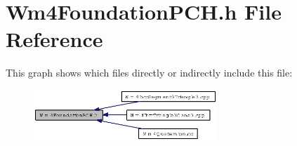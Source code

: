 \section{Wm4Foundation\-PCH.h File Reference}
\label{Wm4FoundationPCH_8h}


This graph shows which files directly or indirectly include this file:\begin{figure}[H]
\begin{center}
\leavevmode
\includegraphics[width=196pt]{Wm4FoundationPCH_8h__dep__incl}
\end{center}
\end{figure}
